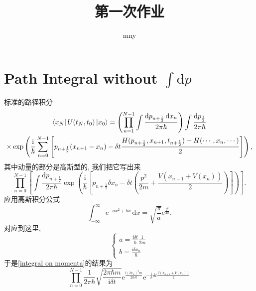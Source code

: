 \documentclass{ctexart}
\title{第一次作业}
\author{mny}
\begin{document}
\maketitle

\section{Path Integral without $\int \mathrm{d} p$}
标准的路径积分
\begin{equation}
  \begin{gathered}
    \bra{x_N}U(t_N, t_0)\ket{x_0} = \left( \prod_{n=1}^{N-1} \int \frac{\mathrm{d} p_{n+ \frac{1}{2}} \, \mathrm{d} x_n}{2\pi \hbar} \right) \int  \frac{\mathrm{d} p_{\frac{1}{2}}}{2\pi\hbar} 
    \\
    \times 
    \exp\left( 
        \frac{\mathrm{i} }{\hbar} \sum_{n=0}^{N-1} \left[ p_{n+ \frac{1}{2}}(x_{n+1}- x_n) - \delta t \frac{H(p_{n+\frac{1}{2}},x_{n+1}, t_{n+ \frac{1}{2}}) + H(\cdots, x_{n},\cdots)}{2} \right] 
     \right) ,
  \end{gathered}
\end{equation}
其中动量的部分是高斯型的, 我们把它写出来
\begin{equation}\label{integral on momenta}
  \prod_{n=0}^{N-1} \left[ 
    \int \frac{\mathrm{d} p_{n+ \frac{1}{2}}}{2\pi\hbar} \exp \left( 
        \frac{\mathrm{i} }{\hbar}\left[ p_{n+ \frac{1}{2}}\delta x_n - \delta t \left( \frac{p^2}{2m}+ \frac{V(x_{n+1}+V(x_n))}{2} \right)  \right] 
     \right) 
   \right] .
\end{equation}
应用高斯积分公式
\begin{equation}
  \int_{-\infty}^{\infty} \mathrm{e}^{-a x^2 + bx} \, \mathrm{d}x = \sqrt{\frac{\pi}{a}} \mathrm{e}^{ \frac{b^2}{4a}}.
\end{equation}
对应到这里,
\begin{equation}
  \begin{cases} 
    a = \frac{\mathrm{i} \delta t}{\hbar} \frac{1}{2m}
    \\ 
    b = \frac{\mathrm{i} \delta x_n}{\hbar}
  \end{cases}
\end{equation}
于是\eqref{integral on momenta}的结果为
\begin{equation}
  \prod_{n=0}^{N-1} \frac{1}{2\pi\hbar} \sqrt{\frac{2\pi \hbar m}{\mathrm{i} \delta t}} \mathrm{e}^{\frac{\mathrm{i} (\delta x_n)^2 m}{2\hbar \delta t}} 
  \mathrm{e}^{- \frac{\mathrm{i} }{\hbar}\delta t \frac{V(x_{n+1}+ V(x_n))}{2}}
\end{equation}
\end{document}
